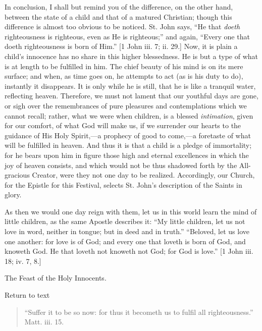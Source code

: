 In conclusion, I shall but remind you of the difference, on the
other hand, between the state of a child and that of a matured
Christian; though this difference is almost too obvious to be noticed.
St. John says, ``He that \emph{doeth} righteousness is righteous,
even as He is righteous;'' and again, ``Every one that doeth
righteousness is born of Him.'' [1 John iii. 7; ii. 29.] Now, it
is plain a child's innocence has no share in this higher blessedness.
He is but a type of what is at length to be fulfilled in him. The
chief beauty of his mind is on its mere surface; and when, as time
goes on, he attempts to act (as is his duty to do), instantly it
disappears. It is only while he is still, that he is like a tranquil
water, reflecting heaven. Therefore, we must not lament that our
youthful days are gone, or sigh over the remembrances of pure
pleasures and contemplations which we cannot recall; rather, what we
were when children, is a blessed \emph{intimation}, given for our
comfort, of what God will make us, if we surrender our hearts to the
guidance of His Holy Spirit,—a prophecy of good to come,—a
foretaste of what will be fulfilled in heaven. And thus it is that a
child is a pledge of immortality; for he bears upon him in figure
those high and eternal excellences in which the joy of heaven
consists, and which would not be thus shadowed forth by the
All-gracious Creator, were they not one day to be realized.
Accordingly, our Church, for the Epistle for this Festival, selects
St. John's description of the Saints in glory.

As then we would one day reign with them, let us in this world
learn the mind of little children, as the same Apostle describes it:
``My little children, let us not love in word, neither in tongue;
but in deed and in truth.'' ``Beloved, let us love one
another: for love is of God; and every one that loveth is born of God,
and knoweth God. He that loveth not knoweth not God; for God is
love.'' [1 John iii. 18; iv. 7, 8.]


The Feast of the Holy Innocents.

Return to text


\begin{quote}

``Suffer it to be so now: for thus it becometh us to fulfil
all righteousness.'' Matt. iii. 15.

\end{quote}

